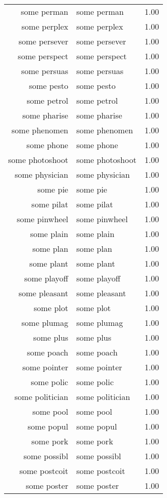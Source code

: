 \begin{table}[ht]
\begin{tabular}{rlr}
  some perman & some perman & 1.00 \\ 
  some perplex & some perplex & 1.00 \\ 
  some persever & some persever & 1.00 \\ 
  some perspect & some perspect & 1.00 \\ 
  some persuas & some persuas & 1.00 \\ 
  some pesto & some pesto & 1.00 \\ 
  some petrol & some petrol & 1.00 \\ 
  some pharise & some pharise & 1.00 \\ 
  some phenomen & some phenomen & 1.00 \\ 
  some phone & some phone & 1.00 \\ 
  some photoshoot & some photoshoot & 1.00 \\ 
  some physician & some physician & 1.00 \\ 
  some pie & some pie & 1.00 \\ 
  some pilat & some pilat & 1.00 \\ 
  some pinwheel & some pinwheel & 1.00 \\ 
  some plain & some plain & 1.00 \\ 
  some plan & some plan & 1.00 \\ 
  some plant & some plant & 1.00 \\ 
  some playoff & some playoff & 1.00 \\ 
  some pleasant & some pleasant & 1.00 \\ 
  some plot & some plot & 1.00 \\ 
  some plumag & some plumag & 1.00 \\ 
  some plus & some plus & 1.00 \\ 
  some poach & some poach & 1.00 \\ 
  some pointer & some pointer & 1.00 \\ 
  some polic & some polic & 1.00 \\ 
  some politician & some politician & 1.00 \\ 
  some pool & some pool & 1.00 \\ 
  some popul & some popul & 1.00 \\ 
  some pork & some pork & 1.00 \\ 
  some possibl & some possibl & 1.00 \\ 
  some postcoit & some postcoit & 1.00 \\ 
  some poster & some poster & 1.00 \\ 

\end{tabular}
\end{table}
